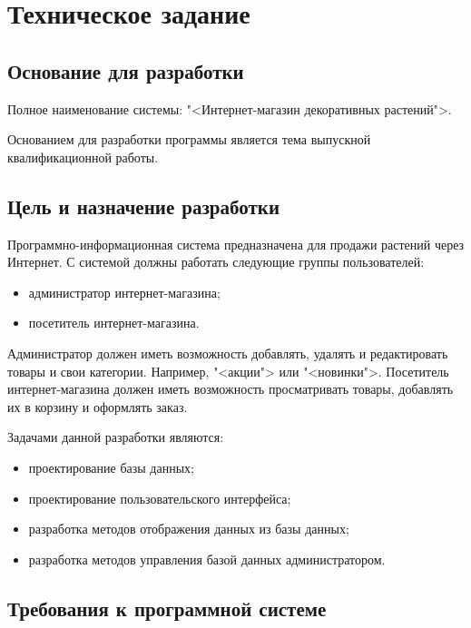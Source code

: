 \section{Техническое задание}
\subsection{Основание для разработки}

Полное наименование системы: "<Интернет-магазин декоративных растений">.

Основанием для разработки программы является тема выпускной квалификационной работы.


\subsection{Цель и назначение разработки}

Программно-информационная система предназначена для продажи растений через Интернет.
С системой должны работать следующие группы пользователей:
\begin{itemize}
	\item администратор интернет-магазина;
	\item посетитель интернет-магазина.
\end{itemize}

Администратор должен иметь возможность добавлять, удалять и редактировать товары и свои категории. Например, "<акции"> или "<новинки">.
Посетитель интернет-магазина должен иметь возможность просматривать товары, добавлять их в корзину и оформлять заказ.

Задачами данной разработки являются:
\begin{itemize}
	\item проектирование базы данных;
	\item проектирование пользовательского интерфейса;
	\item разработка методов отображения данных из базы данных;
	\item разработка методов управления базой данных администратором.
\end{itemize}

\subsection{Требования к программной системе}


